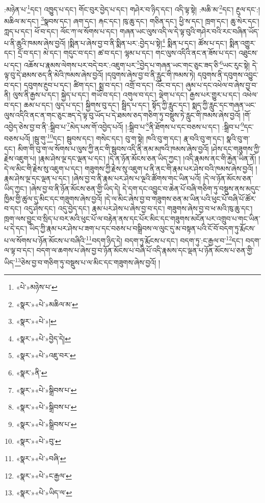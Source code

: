 :མཉེན་པ་\footnote{«པེ་»མཉེས་པ་}དང་། འཁྱུད་པ་དང་། གོང་བུར་བྱེད་པ་དང་། གཤེར་བ་ཉིད་དང་། འདི་ལྟ་སྟེ། :མཆི་མ་\footnote{«སྣར་»«པེ་»མཆིལ་མ་}དང་། རྔུལ་དང་:། མཆིལ་མ་དང་། \footnote{«སྣར་»«པེ་»།  }སྣབས་དང་། ཞག་དང་། རྐང་དང་། ཁུ་ཆུ་དང་། གཅིན་དང་། ཕྱི་ས་དང་། ཁྲག་དང་། ཆུ་སེར་དང་། ཀླད་པ་དང་། ཕོ་བ་དང་། ལོང་ཀ་ལ་སོགས་པ་དང་། གཞན་ཡང་ལུས་འདི་ལ་དེ་ལྟ་བུའི་གཤེར་བའི་རང་བཞིན་ཡོད་པ་ནི་ཆུའི་ཁམས་ཞེས་བྱའོ། །སྨིན་པ་ཞེས་བྱ་བ་ནི་སྨིན་པར་:བྱེད་པ་སྟེ།\footnote{«སྣར་»«པེ་»བྱེད་དེ།} སྨིན་པ་དང་། ཚོས་པ་དང་། སྨིན་འགྱུར་དང་། དྲོ་བ་དང་། མེ་དང་། གདུང་བ་དང་། ཚ་བ་དང་། ལྷམ་པ་དང་། གང་ལུས་འདིའི་ནང་ན་ཟོས་པ་དང་། འཐུངས་པ་དང་། འཆོས་པ་རྣམས་ལེགས་པར་བདེ་བར་:འཇུག་པར་\footnote{«སྣར་»«པེ་»འཇུ་བར་}བྱེད་པ་གཞན་ཡང་གང་ཅུང་ཟད་ཅི་\footnote{«སྣར་»ནི་}ཡང་རུང་སྟེ། དེ་ལྟ་བུ་དེ་ཐམས་ཅད་ནི་མེའི་ཁམས་ཞེས་བྱའོ། །དབུགས་ཞེས་བྱ་བ་ནི་རླུང་གི་ཁམས་ཏེ། དབུགས་ནི་དབུགས་འབྱུང་བ་དང་། དབུགས་རྔུབ་པ་དང་། ཚིག་དང་། སྨྲ་བ་དང་། འགྲོ་བ་དང་། འོང་བ་དང་། ཞུམ་པ་དང་འཕེལ་བ་ཞེས་བྱ་བ་ནི། ལུས་ནི་རྒྱས་པ་དང་། སྐྱེད་པ་དང་། གཡོ་བ་དང་། འགུལ་བ་དང་། ལྡེག་པ་དང་། རྒྱས་པར་གྱུར་པ་དང་། འཕེལ་བ་དང་། ཆམ་པ་དང་། ལུད་པ་དང་། སྐྱིགས་བུ་དང་། སྦྲིད་པ་དང་། སྟོད་ཀྱི་རླུང་དང་། སྨད་ཀྱི་རླུང་དང་གཞན་ཡང་ལུས་འདིའི་ནང་ན་གང་ཅུང་ཟད་དེ་ལྟ་བུ་ཡོད་པ་དེ་ཐམས་ཅད་གཅིག་ཏུ་བསྡུས་ཏེ་རླུང་གི་ཁམས་ཞེས་བྱའོ། །གོ་འབྱེད་ཅེས་བྱ་བ་ནི་:སྒྲིབ་པ་\footnote{«སྣར་»«པེ་»སྒྲིབས་པ་}མེད་པས་གོ་འབྱེད་པའོ། །:སྒྲིབ་པ་\footnote{«སྣར་»«པེ་»སྒྲིབས་པ་}ནི་ཐོགས་པ་དང་བཅས་པ་དང་། :སྒྲིབ་པ་\footnote{«སྣར་»«པེ་»སྒྲིབས་པ་}དང་བཅས་པའོ། །སྦུ་གུ་\footnote{«སྣར་»«པེ་»བུ་}དང་། སྦུབས་དང་། གསེང་དང་། བུ་ག་སྟེ། ཁའི་བུ་ག་དང་། རྣ་བའི་བུ་ག་དང་། སྣའི་བུ་ག་དང་། མིག་གི་བུ་ག་ལ་སོགས་པ་ལུས་ཀྱི་ནང་གི་སྦུབས་འདི་ནི་ནམ་མཁའི་ཁམས་ཞེས་བྱའོ། །ཤེས་དང་གཟུགས་ཀྱི་རྗེས་འཇུག་པ། །རྣམ་ཤེས་ལྔ་དང་ལྡན་པ་དང་། །དེ་ན་ཉོན་མོངས་ཅན་ཡིད་ཀྱང་། །འདི་རྣམས་ནང་གི་རྐྱེན་ཡིན་ནོ། །དེ་ལ་མིང་གི་རྗེས་སུ་འཇུག་པ་དང་། གཟུགས་ཀྱི་རྗེས་སུ་འཇུག་པ་ནི་ནང་གི་རྣམ་པར་ཤེས་བའི་ཁམས་ཞེས་བྱའོ། །རྣམ་ཤེས་ལྔ་དང་ལྡན་པ་དང་། །ཞེས་བྱ་བ་ནི་རྣམ་པར་ཤེས་པ་ལྔའི་ཚོགས་གང་ཡིན་པའོ། །དེ་ལ་ཉོན་མོངས་ཅན་ཡིད་ཀྱང་། །ཞེས་བྱ་བ་ནི་ཉོན་མོངས་ཅན་གྱི་ཡིད་དེ། དེ་དག་དང་འབྱུང་བ་ཆེན་པོ་བཞི་གཅིག་ཏུ་བསྡུས་ནས་མདུང་ཁྱིམ་གྱི་ཚུལ་དུ་མིང་དང་གཟུགས་ཞེས་བྱའོ། །དེ་ལ་མིང་ཞེས་བྱ་བ་གཟུགས་ཅན་མ་ཡིན་པའི་ཕུང་པོ་བཞི་པོ་ཚོར་བ་དང་། འདུ་ཤེས་དང་། འདུ་བྱེད་དང་། རྣམ་པར་ཤེས་པ་ཞེས་བྱ་བ་དང་། གཟུགས་ཞེས་བྱ་བ་ཕ་མའི་ཁུ་ཆུ་དང་། ཁྲག་ལས་བྱུང་བ་སྲིད་པ་བར་མའི་ཕུང་པོ་ལ་བརྟེན་ནས་དང་པོར་མིང་དང་གཟུགས་མངོན་པར་འགྲུབ་པ་གང་ཡིན་པ་དེ་དང་། ཡིད་ཀྱི་རྣམ་པར་ཤེས་པ་ཟག་པ་དང་བཅས་པ་བསྒྲིབས་ལ་ལུང་དུ་མ་བསྟན་པའི་ངོ་བོ་བདག་ཏུ་རྨོངས་པ་ལ་སོགས་པ་ཉོན་མོངས་པ་བཞིའི་\footnote{«སྣར་»«པེ་»བཞི་}བདག་ཉིད་དེ། བདག་ཏུ་རྨོངས་པ་དང་། བདག་ཏུ་:ང་རྒྱལ་བ་\footnote{«སྣར་»«པེ་»ང་རྒྱལ་}དང་། བདག་ལ་ལྟ་བ་དང་། བདག་ལ་ཆགས་པ་ཞེས་བྱ་བ་ཉོན་མོངས་པ་བཞི་པོ་འདི་རྣམས་དང་ལྡན་པ་ཉོན་མོངས་པ་ཅན་གྱི་ཡིད་\footnote{«སྣར་»«པེ་»ཡིད་ལ་}ཅེས་བྱ་བ་གཅིག་ཏུ་བསྡུས་པ་ལ་མིང་དང་གཟུགས་ཞེས་བྱའོ། །
